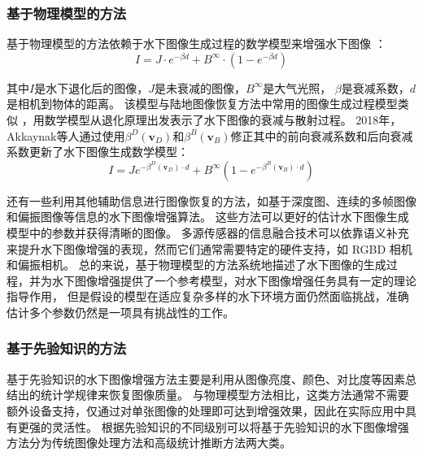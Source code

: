 \subsubsection{基于物理模型的方法}
基于物理模型的方法依赖于水下图像生成过程的数学模型来增强水下图像 \cite{uw_img_math1}\cite{uw_img_math2}：
\begin{equation}
I=J \cdot e^{-\beta d}+B^{\infty} \cdot\left(1-e^{-\beta d}\right) 
\label{IFM1}
\end{equation}

其中$I$是水下退化后的图像，$J$是未衰减的图像，$B^{\infty}$是大气光照， $\beta$是衰减系数，$d$是相机到物体的距离。
该模型与陆地图像恢复方法中常用的图像生成过程模型类似 \cite{ifm}，用数学模型从退化原理出发表示了水下图像的衰减与散射过程。
2018年，Akkaynak等人\cite{modified_uw_img_math}通过使用$\beta^D\left(\mathbf{v}_D\right)$和$\beta^B\left(\mathbf{v}_B\right)$修正其中的前向衰减系数和后向衰减系数更新了水下图像生成数学模型：
\begin{equation}
    I=J e^{-\beta^D\left(\mathbf{v}_D\right) \cdot d}+B^{\infty}\left(1-e^{-\beta^B\left(\mathbf{v}_B\right) \cdot d}\right)
    \label{IFM2}
\end{equation}

还有一些利用其他辅助信息进行图像恢复的方法，如基于深度图\cite{depth_img}、连续的多帧图像\cite{multi_frame}和偏振图像\cite{U2PNet}等信息的水下图像增强算法。
这些方法可以更好的估计水下图像生成模型中的参数并获得清晰的图像。
多源传感器的信息融合技术\cite{fusion}可以依靠语义补充来提升水下图像增强的表现，然而它们通常需要特定的硬件支持，如 RGBD 相机和偏振相机。
总的来说，基于物理模型的方法系统地描述了水下图像的生成过程，并为水下图像增强提供了一个参考模型，对水下图像增强任务具有一定的理论指导作用，
但是假设的模型在适应复杂多样的水下环境方面仍然面临挑战，准确估计多个参数仍然是一项具有挑战性的工作。

\subsubsection{基于先验知识的方法}
基于先验知识的水下图像增强方法主要是利用从图像亮度、颜色、对比度等因素总结出的统计学规律来恢复图像质量。
与物理模型方法相比，这类方法通常不需要额外设备支持，仅通过对单张图像的处理即可达到增强效果，因此在实际应用中具有更强的灵活性。
根据先验知识的不同级别可以将基于先验知识的水下图像增强方法分为传统图像处理方法和高级统计推断方法两大类。

